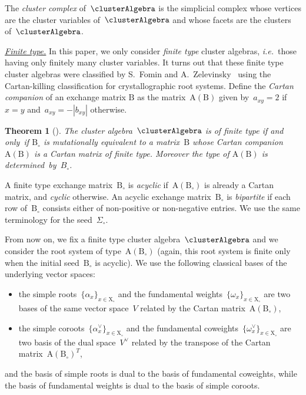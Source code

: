 \documentclass{amsart}
\newtheorem{theorem}{Theorem}[section]
\theoremstyle{definition}
\newcommand{\transpose}[1]{{#1}^T} %
\newcommand{\ie}{\textit{i.e.}~} %
\newcommand{\darkblue}{\color{darkblue}} %
\newcommand{\defn}[1]{\textsl{\darkblue #1}} %
\newcommand{\para}[1]{\medskip\noindent\uline{\textit{#1.}}} %
\newcommand{\seed}{\Sigma} %
\newcommand{\cluster}{\mathrm{X}} %
\newcommand{\B}{\mathrm{B}} %
\newcommand{\A}[1]{\mathrm{A}({#1})} %
\newcommand{\simpleRoot}{\alpha} %
\newcommand{\fundamentalWeight}{\omega} %
\begin{document}
The \defn{cluster complex} of~$\clusterAlgebra$ is the simplicial complex whose vertices are the cluster variables of~$\clusterAlgebra$ and whose facets are the clusters of~$\clusterAlgebra$.

\para{Finite type}
%
In this paper, we only consider \defn{finite type} cluster algebras, \ie those having only finitely many cluster variables.
It turns out that these finite type cluster algebras were classified by S.~Fomin and A.~Zelevinsky~\cite{FominZelevinsky-ClusterAlgebrasII} using the Cartan-killing classification for crystallographic root systems.
Define the \defn{Cartan companion} of an exchange matrix $\B$ as the matrix~$\A{\B}$ given by~$a_{xy} = 2$ if~$x = y$ and~$a_{xy} = -|b_{xy}|$ otherwise.

\begin{theorem}[{\cite[Theorem~1.4]{FominZelevinsky-ClusterAlgebrasII}}]
\label{thm:finiteTypeClassification}
The cluster algebra~$\clusterAlgebra$ is of finite type if and only~if $\B_\circ$ is mutationally equivalent to a matrix~$\B$ whose Cartan companion~$\A{\B}$ is a Cartan matrix of finite type. Moreover the type of $\A{\B}$ is determined~by~$B_\circ$.
\end{theorem}

A finite type exchange matrix~$\B_\circ$ is \defn{acyclic} if~$\A{\B_\circ}$ is already a Cartan matrix, and \defn{cyclic} otherwise.
An acyclic exchange matrix~$\B_\circ$ is \defn{bipartite} if each row of~$\B_\circ$ consists either of non-positive or non-negative entries.
We use the same terminology for the seed~$\seed_\circ$.

From now on, we fix a finite type cluster algebra~$\clusterAlgebra$ and we consider the root system of type~$\A{\B_\circ}$ (again, this root system is finite only when the initial seed~$\B_\circ$ is acyclic). We use the following classical bases of the underlying vector spaces:
\begin{itemize}
\item the simple roots~$\{\simpleRoot_x\}_{x \in \cluster_\circ}$ and the fundamental weights~$\{\fundamentalWeight_x\}_{x \in \cluster_\circ}$ are two bases of the same vector space~$V$ related by the Cartan matrix~$\A{\B_\circ}$,
\item the simple coroots~$\{\simpleRoot^\vee_x\}_{x \in \cluster_\circ}$ and the fundamental coweights~$\{\fundamentalWeight^\vee_x\}_{x \in \cluster_\circ}$ are two basis of the dual space~$V^\vee$ related by the transpose of the Cartan matrix~$\transpose{\A{\B_\circ}}$,
\end{itemize}
and the basis of simple roots is dual to the basis of fundamental coweights, while the basis of fundamental weights is dual to the basis of simple coroots.
\end{document}
